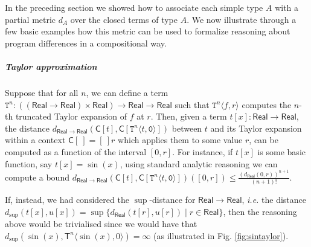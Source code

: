

In the preceding section we showed how to associate each simple type $A$ with a  partial metric $d_{A}$ over the closed terms of type $A$. We now illustrate through a few basic examples how this metric can be used to formalize reasoning about program differences in a compositional way.




\subparagraph*{Taylor approximation}

Suppose that for all $n$, we can define a term $\mathtt T^{n}: ((\mathsf{Real}\to \mathsf{Real})\times \mathsf{Real})\to \mathsf{Real}\to \mathsf{Real}$ such that $\mathtt T^{n}\langle f, r\rangle$ computes the $n$-th truncated Taylor expansion of $f$ at $r$. 
Then, given a term $t[x]: \mathsf{Real}\to \mathsf{Real}$, the distance 
$d_{\mathsf{Real}\to \mathsf{Real}}(\mathsf C[t],\mathsf C[ \mathtt T^{n}\langle t,\mathtt 0 \rangle])$
between $t$ and its Taylor expansion within a context  $\mathsf C[\ ]= [\ ] r$ which applies them to some value $r$, can be computed as a function of the interval $[0,r]$.   
For instance, if $t[x]$ is some basic function, say $t[x]=\sin(x)$, using standard analytic reasoning we can compute a bound
$d_{\mathsf{Real}\to \mathsf{Real}}(\mathsf C[t],\mathsf C[ \mathtt T^{n}\langle t,\mathtt 0 \rangle])([0,r]  )\leq \frac{(d_{\mathsf{Real}}(0,r))^{n+1}}{(n+1)!} $.

\begin{remark}
If, instead, we had considered the $\sup$-distance for $\mathsf{Real}\to \mathsf{Real}$, \emph{i.e.} the distance $d_{\sup}(t[x],u[x])= \sup\{d_{\mathsf{Real}}(t[r], u[r])\mid r\in \mathsf{Real}\}$, then the reasoning above would be trivialised since we would have that 
$d_{\sup}(\sin(x), \mathsf T^{n} \langle \sin(x),0\rangle)=\infty$ (as illustrated in Fig. \ref{fig:sintaylor}).  
\end{remark}

